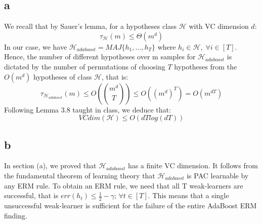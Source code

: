 \subsection*{a}
We recall that by Sauer's lemma, for a hypotheses class $\mathcal{H}$ with VC dimension $d$:
\begin{equation*}
    \tau_{\mathcal{H}}(m) \leq \Theta(m^d)
\end{equation*}
In our case, we have $\mathcal{H}_\mathit{adaboost} = MAJ\{h_1, \dotsc , h_T\}$ where $h_i \in \mathcal{H}, \; \forall i \in [T]$. Hence, the number of different hypotheses over m samples for $\mathcal{H}_\mathit{adaboost}$ is dictated by the number of permutations of choosing $T$ hypotheses from the $O(m^d)$ hypotheses of class $\mathcal{H}$, that is:
\begin{equation*}
    \tau_{\mathcal{H}_\mathit{adaboost}}(m) \leq O(\binom{m^d}{T}) \leq O((m^d) ^ T) = O(m^{dT})
\end{equation*}
Following Lemma 3.8 taught in class, we deduce that:
\begin{equation*}
    VCdim(\mathcal{H}) \leq O(dT log(dT))
\end{equation*}

\subsection*{b}
In section (a), we proved that $\mathcal{H}_\mathit{adaboost}$ has a finite VC dimension. It follows from the fundamental theorem of learning theory that $\mathcal{H}_\mathit{adaboost}$ is PAC learnable by any ERM rule.
To obtain an ERM rule, we need that all T weak-learners are successful, that is $err(h_t) \leq \frac{1}{2} - \gamma ;\, \forall t\in [T]$. This means that a single unsuccessful weak-learner is sufficient for the failure of the entire AdaBoost ERM finding.

